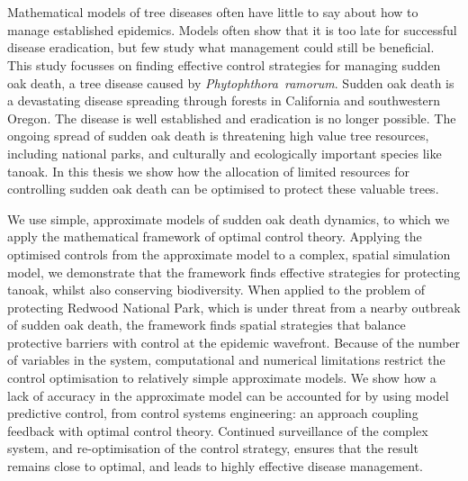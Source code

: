 %


{\chapter*{}}
\label{sec:abstract}
\vspace*{-10mm}

\begin{center}
    {\Large\thesisTitle}
    
    \vspace*{5mm}
    
    {\large\thesisName}
    \vspace*{10mm}
\end{center}

Mathematical models of tree diseases often have little to say about how to manage established epidemics. Models often show that it is too late for successful disease eradication, but few study what management could still be beneficial. This study focusses on finding effective control strategies for managing sudden oak death, a tree disease caused by \emph{Phytophthora~ramorum}. Sudden oak death is a devastating disease spreading through forests in California and southwestern Oregon. The disease is well established and eradication is no longer possible. The ongoing spread of sudden oak death is threatening high value tree resources, including national parks, and culturally and ecologically important species like tanoak. In this thesis we show how the allocation of limited resources for controlling sudden oak death can be optimised to protect these valuable trees.

We use simple, approximate models of sudden oak death dynamics, to which we apply the mathematical framework of optimal control theory. Applying the optimised controls from the approximate model to a complex, spatial simulation model, we demonstrate that the framework finds effective strategies for protecting tanoak, whilst also conserving biodiversity. When applied to the problem of protecting Redwood National Park, which is under threat from a nearby outbreak of sudden oak death, the framework finds spatial strategies that balance protective barriers with control at the epidemic wavefront. Because of the number of variables in the system, computational and numerical limitations restrict the control optimisation to relatively simple approximate models. We show how a lack of accuracy in the approximate model can be accounted for by using model predictive control, from control systems engineering: an approach coupling feedback with optimal control theory. Continued surveillance of the complex system, and re-optimisation of the control strategy, ensures that the result remains close to optimal, and leads to highly effective disease management.

